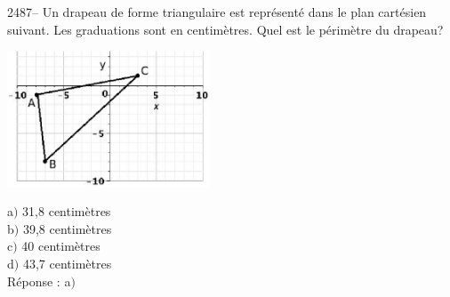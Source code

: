 \documentclass[letterpaper, 12pt]{article}
\begin{document}
2487--  Un drapeau de forme triangulaire est repr\'esent\'e dans le plan cart\'esien suivant. Les graduations sont en centim\`etres. Quel est le p\'erim\`etre du drapeau?\\
\begin{center}
 \includegraphics[width=6cm,bb=14 14 406 276]{Q2486.eps}
\end{center}

a$)$ 31,8 centim\`etres\\
b$)$ 39,8 centim\`etres\\
c$)$ 40 centim\`etres\\
d$)$ 43,7 centim\`etres\\

R\'eponse : a$)$\\
\end{document}
